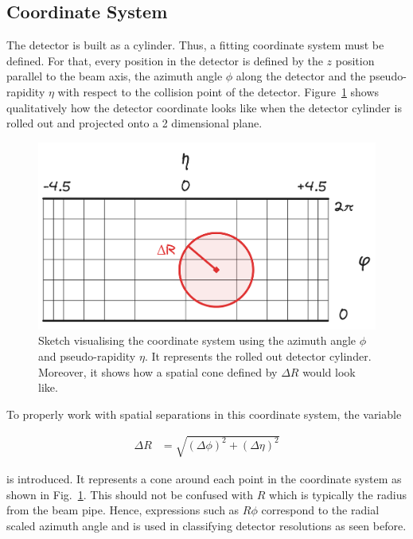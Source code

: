 \documentclass[bachelor,ngerman,english]{GAUBM}
\begin{document}
\subsection{Coordinate System}
\label{sec:exp:atlas_coordinate_system}
The \atlas detector is built as a cylinder. Thus, a fitting coordinate system must be defined. For that, every position in the detector is defined by the $z$ position parallel to the beam axis, the azimuth angle $\phi$ along the detector and the pseudo-rapidity $\eta$ with respect to the collision point of the detector. Figure~\ref{fig:atlas_coordinate_system} shows qualitatively how the detector coordinate looks like when the detector cylinder is rolled out and projected onto a 2 dimensional plane. 

\begin{figure}[t]
    \centering
    \includegraphics[width=.80\textwidth]{figures/lhc/atlas_coordinate_system.excalidraw.png}
    \caption{Sketch visualising the \atlas coordinate system using the azimuth angle $\phi$ and pseudo-rapidity $\eta$. It represents the rolled out detector cylinder. Moreover, it shows how a spatial cone defined by $\Delta R$ would look like.}
    \label{fig:atlas_coordinate_system}
\end{figure}

To properly work with spatial separations in this coordinate system, the variable

\begin{align}
    \Delta R &= \sqrt{\left(\Delta \phi\right)^2 + \left(\Delta \eta\right)^2}\label{eq:delta_r}
\end{align} 

is introduced. It represents a cone around each point in the coordinate system as shown in Fig.~\ref{fig:atlas_coordinate_system}. This should not be confused with $R$ which is typically the radius from the beam pipe. Hence, expressions such as $R\phi$ correspond to the radial scaled azimuth angle and is used in classifying detector resolutions as seen before.
\end{document}
